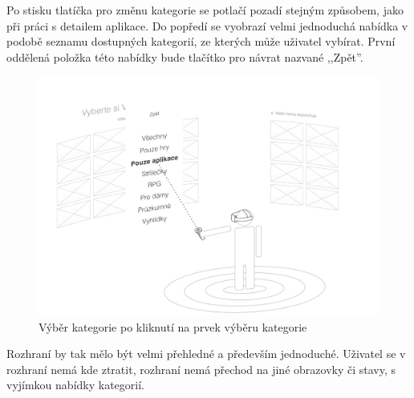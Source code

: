 Po stisku tlatíčka pro změnu kategorie se potlačí pozadí stejným
způsobem, jako při práci s detailem aplikace. Do popředí se vyobrazí
velmi jednoduchá nabídka v podobě seznamu dostupných kategorií, ze
kterých může uživatel vybírat. První oddělená položka této nabídky bude
tlačítko pro návrat nazvané ,,Zpět''.

\begin{figure}[h!]
\centering
\includegraphics[width=\textwidth]{src/assets/wireframe-sorting.pdf}
\caption{Výběr kategorie po kliknutí na prvek výběru kategorie}
\end{figure}

Rozhraní by tak mělo být velmi přehledné a především jednoduché.
Uživatel se v rozhraní nemá kde ztratit, rozhraní nemá přechod na jiné
obrazovky či stavy, s vyjímkou nabídky kategorií.

